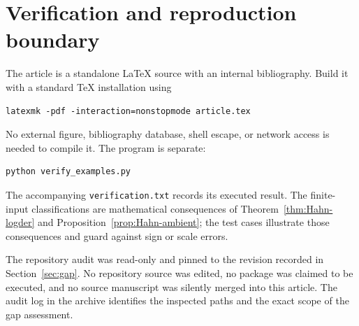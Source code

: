 \documentclass[11pt,a4paper]{article}
\numberwithin{equation}{section}
\theoremstyle{definition}
\theoremstyle{remark}
\newcommand{\code}[1]{\texttt{#1}}
\begin{document}
\section{Verification and reproduction boundary}
\label{app:verification}

The article is a standalone LaTeX source with an internal bibliography.
Build it with a standard TeX installation using
\begin{verbatim}
latexmk -pdf -interaction=nonstopmode article.tex
\end{verbatim}
No external figure, bibliography database, shell escape, or network access
is needed to compile it. The program is separate:
\begin{verbatim}
python verify_examples.py
\end{verbatim}
The accompanying \code{verification.txt} records its executed result.
The finite-input classifications are mathematical consequences of
Theorem~\ref{thm:Hahn-logder} and Proposition~\ref{prop:Hahn-ambient}; the test cases
illustrate those consequences and guard against sign or scale errors.

The repository audit was read-only and pinned to the revision recorded in
Section~\ref{sec:gap}. No repository source was edited, no package was
claimed to be executed, and no source manuscript was silently merged into
this article. The audit log in the archive identifies the inspected paths
and the exact scope of the gap assessment.
\end{document}
